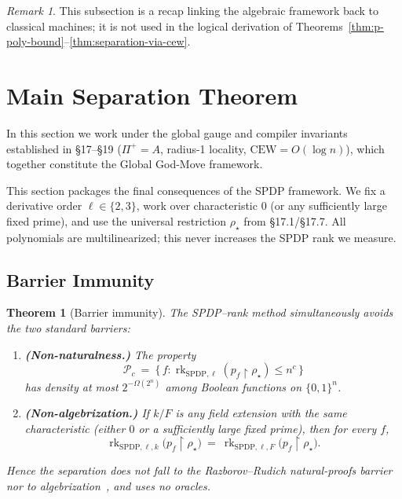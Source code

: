 \documentclass[12pt]{article}
\newtheorem{theorem}{Theorem}
\theoremstyle{definition}
\theoremstyle{definition}
\theoremstyle{remark}
\newtheorem{remark}{Remark}
\theoremstyle{remark}
\begin{document}
\begin{remark}
This subsection is a recap linking the algebraic framework back to classical machines; it is not used in the logical derivation of Theorems~\ref{thm:p-poly-bound}--\ref{thm:separation-via-cew}.
\end{remark}

\section{Main Separation Theorem}

In this section we work under the global gauge and compiler invariants established in \S17--\S19 ($\Pi^+=A$, radius-1 locality, $\mathrm{CEW}=O(\log n)$), which together constitute the Global God-Move framework.

This section packages the final consequences of the SPDP framework. We fix a derivative order $\ell\in\{2,3\}$, work over characteristic $0$ (or any sufficiently large fixed prime), and use the universal restriction $\rho_\star$ from \S17.1/\S17.7. All polynomials are multilinearized; this never increases the SPDP rank we measure.

\subsection{Barrier Immunity}

\begin{theorem}[Barrier immunity]\label{thm:barrier-immunity}
The SPDP--rank method simultaneously avoids the two standard barriers:
\begin{enumerate}
\item \textbf{(Non-naturalness.)} The property
\[
\mathcal{P}_c\ =\ \bigl\{\,f:\operatorname{rk}_{\mathrm{SPDP},\ell}(p_f\!\upharpoonright \rho_\star)\le n^c\,\bigr\}
\]
has density at most $2^{-\Omega(2^n)}$ among Boolean functions on $\{0,1\}^n$.

\item \textbf{(Non-algebrization.)} If $k/F$ is any field extension with the same characteristic (either $0$ or a sufficiently large fixed prime), then for every $f$,
\[
\operatorname{rk}_{\mathrm{SPDP},\ell,k}\!\big(p_f\!\upharpoonright\rho_\star\big)
\ =\
\operatorname{rk}_{\mathrm{SPDP},\ell,F}\!\big(p_f\!\upharpoonright\rho_\star\big).
\]
\end{enumerate}
Hence the separation does not fall to the Razborov--Rudich natural-proofs barrier~\cite{razborov1997} nor to algebrization~\cite{aaronson2009}, and uses no oracles.
\end{theorem}
\end{document}
